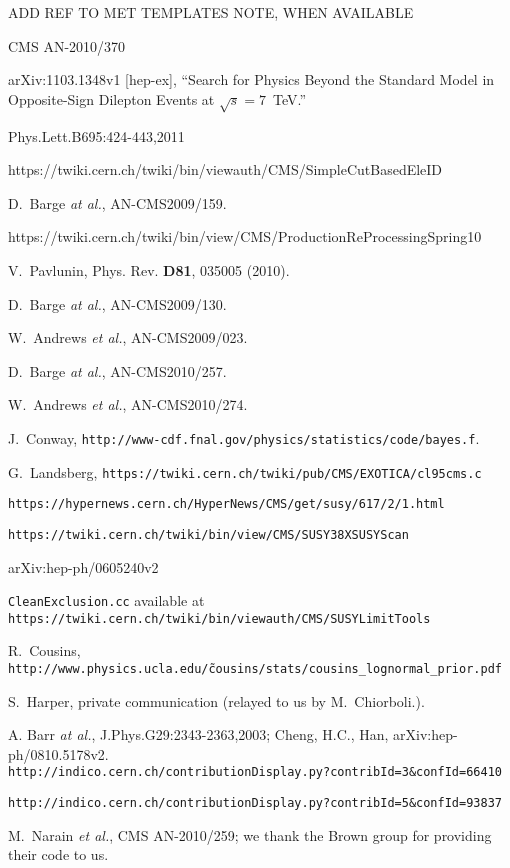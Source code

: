 \begin{thebibliography}{10}

 ADD REF TO MET TEMPLATES NOTE, WHEN AVAILABLE

 CMS AN-2010/370

 arXiv:1103.1348v1 [hep-ex], ``Search for Physics Beyond the Standard Model in Opposite-Sign Dilepton Events at $\sqrt{s} = 7$~TeV.''

 Phys.Lett.B695:424-443,2011 

 https://twiki.cern.ch/twiki/bin/viewauth/CMS/SimpleCutBasedEleID

 D.~Barge {\em at al.}, AN-CMS2009/159.

 https://twiki.cern.ch/twiki/bin/view/CMS/ProductionReProcessingSpring10 


V.~Pavlunin, Phys. Rev. {\bf D81}, 035005 (2010).

  D.~Barge {\em at al.}, AN-CMS2009/130.

 W.~Andrews {\em et al.}, AN-CMS2009/023.

 D.~Barge {\em at al.}, AN-CMS2010/257.

W.~Andrews {\em et al.}, AN-CMS2010/274.

 J.~Conway, {\tt http://www-cdf.fnal.gov/physics/statistics/code/bayes.f}.

 G.~Landsberg, {\tt https://twiki.cern.ch/twiki/pub/CMS/EXOTICA/cl95cms.c}

 {\tt https://hypernews.cern.ch/HyperNews/CMS/get/susy/617/2/1.html}

 {\tt https://twiki.cern.ch/twiki/bin/view/CMS/SUSY38XSUSYScan}

 arXiv:hep-ph/0605240v2

 {\tt CleanExclusion.cc} available at
{\tt https://twiki.cern.ch/twiki/bin/viewauth/CMS/SUSYLimitTools}

 R.~Cousins, {\tt http://www.physics.ucla.edu/\~cousins/stats/cousins\_lognormal\_prior.pdf}

 S.~Harper, private communication (relayed to us by M.~Chiorboli.).

 A. Barr {\em at al.}, J.Phys.G29:2343-2363,2003;
Cheng, H.C., Han, arXiv:hep-ph/0810.5178v2.\\
{\tt http://indico.cern.ch/contributionDisplay.py?contribId=3\&confId=66410}

 {\tt http://indico.cern.ch/contributionDisplay.py?contribId=5\&confId=93837}

 M.~Narain {\em et al.}, CMS AN-2010/259; we thank the 
Brown group for providing their code to us.


    
\end{thebibliography}
